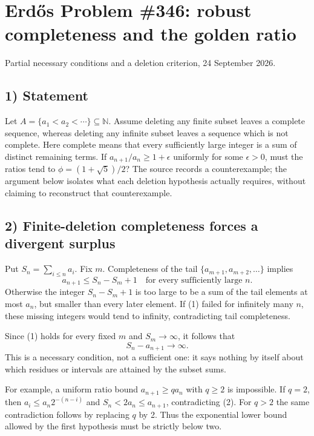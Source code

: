 \section{Erd\H{o}s Problem \#346: robust completeness and the golden ratio}
\noindent Partial necessary conditions and a deletion criterion, 24 September 2026.

\subsection*{1) Statement}
Let $A=\{a_1<a_2<\cdots\}\subseteq\mathbb N$. Assume deleting any finite subset leaves a complete sequence, whereas deleting any infinite subset leaves a sequence which is not complete. Here complete means that every sufficiently large integer is a sum of distinct remaining terms. If $a_{n+1}/a_n\ge1+\epsilon$ uniformly for some $\epsilon>0$, must the ratios tend to $\phi=(1+\sqrt5)/2$? The source records a counterexample; the argument below isolates what each deletion hypothesis actually requires, without claiming to reconstruct that counterexample.

\subsection*{2) Finite-deletion completeness forces a divergent surplus}
Put $S_n=\sum_{i\le n}a_i$. Fix $m$. Completeness of the tail $\{a_{m+1},a_{m+2},\ldots\}$ implies
\[a_{n+1}\le S_n-S_m+1\quad\text{for every sufficiently large }n.
\tag{1}\]
Otherwise the integer $S_n-S_m+1$ is too large to be a sum of the tail elements at most $a_n$, but smaller than every later element. If (1) failed for infinitely many $n$, these missing integers would tend to infinity, contradicting tail completeness.

Since (1) holds for every fixed $m$ and $S_m\to\infty$, it follows that
\[S_n-a_{n+1}\longrightarrow\infty.\tag{2}\]
This is a necessary condition, not a sufficient one: it says nothing by itself about which residues or intervals are attained by the subset sums.

For example, a uniform ratio bound $a_{n+1}\ge q a_n$ with $q\ge2$ is impossible. If $q=2$, then $a_i\le a_n2^{-(n-i)}$ and $S_n<2a_n\le a_{n+1}$, contradicting (2). For $q>2$ the same contradiction follows by replacing $q$ by 2. Thus the exponential lower bound allowed by the first hypothesis must be strictly below two.

